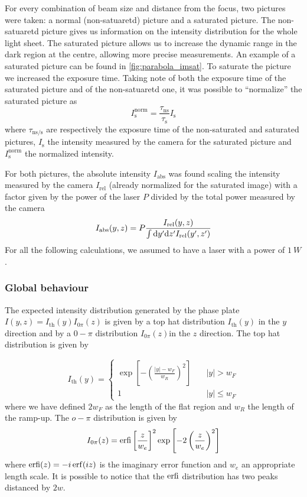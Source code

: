 For every combination of beam size and distance from the focus, two pictures were taken: a normal (non-satuaretd) picture and a saturated picture. The non-satuaretd picture gives us information on the intensity distribution for the whole light sheet. The saturated picture allows us to increase the dynamic range in the dark region at the centre, allowing more precise measurements. An example of a saturated picture can be found in \cref{fig:parabola_imsat}. To saturate the picture we increased the exposure time. Taking note of both the exposure time of the saturated picture and of the non-satuaretd one, it was possible to \enquote{normalize} the saturated picture as
\begin{equation}
    I_\text{s}^\text{norm} = \frac{\tau_\text{ns}}{\tau_\text{s}} I_\text{s}
\end{equation}
where $\tau_\text{ns/s}$ are respectively the exposure time of the non-saturated and saturated pictures, $I_\text{s}$ the intensity measured by the camera for the saturated picture and $I_\text{s}^\text{norm}$ the normalized intensity.

For both pictures, the absolute intensity $I_\text{abs}$ was found scaling the intensity measured by the camera $I_\text{rel}$ (already normalized for the saturated image) with a factor given by the power of the laser $P$ divided by the total power measured by the camera
\begin{equation}
    I_\text{abs}(y,z) = P\frac{I_\text{rel}(y,z)}{
        \int \differential y' \differential z' I_\text{rel}(y',z')}
\end{equation}
For all the following calculations, we assumed to have a laser with a power of $\SI{1}{W}$.

\subsubsection{Global behaviour}
The expected intensity distribution generated by the phase plate $I(y,z) = I_\text{th}(y) I_{0\pi}(z)$ is given by a top hat distribution $I_\text{th}(y)$ in the $y$ direction and by a $0-\pi$ distribution $I_{0\pi}(z)$in the $z$ direction. The top hat distribution is given by

\begin{equation}
    I_\text{th}(y) =
    \begin{cases}
        \exp\left[-\left(\frac{\left|y\right|-w_F}{w_R}\right)^2\right] & \quad |y| > w_F    \\
        1                                                               & \quad |y| \leq w_F
    \end{cases}
\end{equation}
where we have defined $2w_F$ as the length of the flat region and $w_R$ the length of the ramp-up. The $o-\pi$ distribution is given by
\begin{equation}
    I_{0\pi}(z) =  \text{erfi}\left[\frac{z}{w_e}\right]^2 \exp\left[-2 \left(\frac{z}{w_e}\right)^2\right]
\end{equation}
where $\erfi(z) = -i\erf(iz)$ is the imaginary error function and $w_e$ an appropriate length scale. It is possible to notice that the $\text{erfi}$ distribution has two peaks distanced by $2w$.

